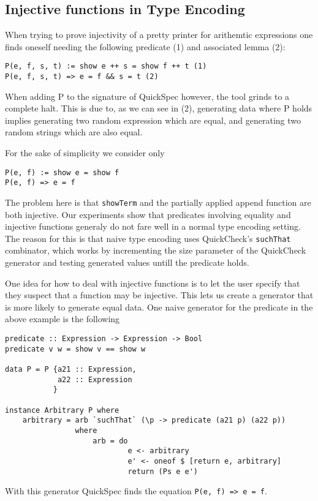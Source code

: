 \subsection{Injective functions in Type Encoding}
When trying to prove injectivity of a pretty printer for arithemtic expressions one
finds oneself needing the following predicate (1) and associated lemma (2):
\begin{verbatim}
P(e, f, s, t) := show e ++ s = show f ++ t (1)
P(e, f, s, t) => e = f && s = t (2)
\end{verbatim}
When adding P to the signature of QuickSpec however, the tool grinds to a complete halt. This is
due to, as we can see in (2), generating data where P holds implies generating two
random expression which are equal, and generating two random strings which are also equal.

For the sake of simplicity we consider only
\begin{verbatim}
P(e, f) := show e = show f
P(e, f) => e = f
\end{verbatim}

The problem here is that \texttt{showTerm} and the partially applied append function are both injective.
Our experiments show that predicates involving equality and injective functions generaly do not
fare well in a normal type encoding setting. The reason for this is that naive type encoding uses
QuickCheck's \texttt{suchThat} combinator, which works by incrementing the size parameter of the QuickCheck
generator and testing generated values untill the predicate holds.

One idea for how to deal with injective functions is to let the user specify that they suspect that 
a function may be injective. This lets us create a generator that is more likely to generate
equal data. One naive generator for the predicate in the above example is the following
\begin{verbatim}
predicate :: Expression -> Expression -> Bool
predicate v w = show v == show w

data P = P {a21 :: Expression,
            a22 :: Expression
           }

instance Arbitrary P where
    arbitrary = arb `suchThat` (\p -> predicate (a21 p) (a22 p))
                where
                    arb = do
                            e <- arbitrary
                            e' <- oneof $ [return e, arbitrary]
                            return (Ps e e')
\end{verbatim}
With this generator QuickSpec finds the equation \texttt{P(e, f) => e = f}.

